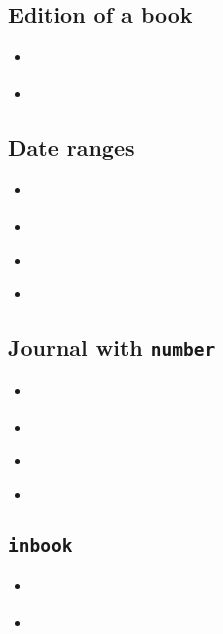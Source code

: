 \documentclass[a4paper,12pt,twoside]{scrartcl}
\newcommand*{\Typ}[1]{\texttt{\symbol{64}#1}}
\newcommand*{\Feld}[1]{\texttt{#1}}
\begin{document}
\subsection{Edition of a book}
\begin{itemize}
    \item\cite{fuchs:kh:et:al:1998}%
    \item{}%
\end{itemize}

\subsection{Date ranges}
\begin{itemize}
    \item\cite{bhattacharyya:1973}%
    \item{}%
    \item\cite{cossel:1933-35}%
    \item{}%
\end{itemize}

\subsection{Journal with \Feld{number}}
\begin{itemize}
    \item\cite{arora:becker:1997}%
    \item{}%
	\item\cite{asmus:1938}%
    \item{}%
\end{itemize}

\subsection{\Typ{inbook}}
\begin{itemize}
    \item\cites{boppert:1998}%
    \item{}%
\end{itemize}

\end{document}
